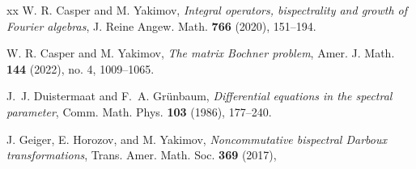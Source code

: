 \documentclass[11pt]{amsart}
\theoremstyle{plain}
\theoremstyle{named}
\begin{document}
\begin{thebibliography}{xx}
 W. R. Casper and  M. Yakimov, {\em{ Integral operators, bispectrality and growth of Fourier algebras}}, J. Reine Angew. Math. {\bf 766} (2020), 151--194.

 W. R. Casper and M. Yakimov, {\em{The matrix {B}ochner problem}}, Amer. J. Math. {\bf 144} (2022), no. 4, 1009--1065.






 J.~J. Duistermaat and F.~A. Gr{\"{u}}nbaum, {\em{Differential equations in the spectral parameter}}, 
Comm. Math. Phys. {\bf{103}} (1986), 177--240.


 J. Geiger, E. Horozov, and M. Yakimov, {\em{Noncommutative bispectral Darboux transformations}}, Trans. Amer. Math. Soc. {\bf{369}} (2017), 






\end{thebibliography}
\end{document}
